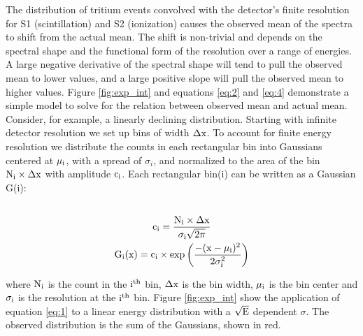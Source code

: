 The distribution of tritium events convolved with the detector's finite resolution for S1 (scintillation) and S2 (ionization) causes the observed mean of the spectra to shift from the actual mean. The shift is non-trivial and depends on the spectral shape and the functional form of the resolution over a range of energies. A large negative derivative of the spectral shape will tend to pull the observed mean to lower values, and a large positive slope will pull the observed mean to higher values. Figure \ref{fig:exp_int} and equations \ref{eq:2} and \ref{eq:4} demonstrate a simple model to solve for the relation between observed mean and actual mean. Consider, for example, a linearly declining distribution. Starting with infinite detector resolution we set up bins of width $\rm \Delta x$. To account for finite energy resolution we distribute the counts in each rectangular bin into Gaussians centered at $\rm \mu_i$, with a spread of $\sigma_i$, and normalized to the area of the bin $\rm N_i \times \Delta x $ with amplitude $\rm c_i$. Each rectangular bin(i) can be written as a Gaussian G(i): \\ 
\begin{multline}
\\ \rm c_i=\frac{N_i \times \Delta x}{\sigma_i\sqrt{2\pi}} \\
\rm G_{i}(x) = c_i \times exp\left(\frac{-(x-\mu_i)^2}{2\sigma_i^2}\right)\\
\label{eq:1}
\end{multline}


\noindent where $\rm N_i$ is the count in the $\rm i^{th}$ bin, $\rm \Delta x$ is the bin width, $\rm \mu_i$ is the bin center and $\rm \sigma_i$ is the resolution at the $\rm i^{th}$ bin. Figure \ref{fig:exp_int} show the application of equation \ref{eq:1} to a linear energy distribution with a $\rm \sqrt{E}$ dependent $\sigma$. The observed distribution is the sum of the Gaussians, shown in red.

